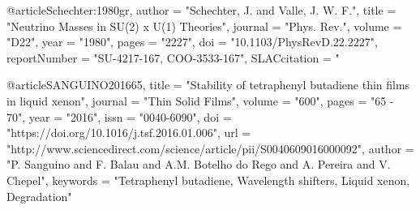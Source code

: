@article{Schechter:1980gr,
      author         = "Schechter, J. and Valle, J. W. F.",
      title          = "{Neutrino Masses in SU(2) x U(1) Theories}",
      journal        = "Phys. Rev.",
      volume         = "D22",
      year           = "1980",
      pages          = "2227",
      doi            = "10.1103/PhysRevD.22.2227",
      reportNumber   = "SU-4217-167, COO-3533-167",
      SLACcitation   = "%
}

@article{SANGUINO201665,
title = "Stability of tetraphenyl butadiene thin films in liquid xenon",
journal = "Thin Solid Films",
volume = "600",
pages = "65 - 70",
year = "2016",
issn = "0040-6090",
doi = "https://doi.org/10.1016/j.tsf.2016.01.006",
url = "http://www.sciencedirect.com/science/article/pii/S0040609016000092",
author = "P. Sanguino and F. Balau and A.M. Botelho do Rego and A. Pereira and V. Chepel",
keywords = "Tetraphenyl butadiene, Wavelength shifters, Liquid xenon, Degradation"
}

